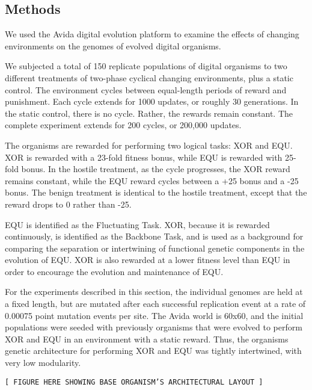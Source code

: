 \subsection{Methods}

We used the Avida digital evolution platform to examine the effects of changing environments on the genomes of evolved digital organisms.

We subjected a total of 150 replicate populations of digital organisms to two different treatments of two-phase cyclical changing environments, plus a static control. The environment cycles between equal-length periods of reward and punishment. Each cycle extends for 1000 updates, or roughly 30 generations. In the static control, there is no cycle. Rather, the rewards remain constant. The complete experiment extends for 200 cycles, or 200,000 updates.

The organisms are rewarded for performing two logical tasks: XOR and EQU. XOR is rewarded with a 23-fold fitness bonus, while EQU is rewarded with 25-fold bonus. In the hostile treatment, as the cycle progresses, the XOR reward remains constant, while the EQU reward cycles between a +25 bonus and a -25 bonus. The benign treatment is identical to the hostile treatment, except that the reward drops to 0 rather than -25.

EQU is identified as the Fluctuating Task. XOR, because it is rewarded continuously, is identified as the Backbone Task, and is used as a background for comparing the separation or intertwining of functional genetic components in the evolution of EQU. XOR is also rewarded at a lower fitness level than EQU in order to encourage the evolution and maintenance of EQU.

For the experiments described in this section, the individual genomes are held at a fixed length, but are mutated after each successful replication event at a rate of 0.00075 point mutation events per site. The Avida world is 60x60, and the initial populations were seeded with previously organisms that were evolved to perform XOR and EQU in an environment with a static reward. Thus, the organisms genetic architecture for performing XOR and EQU was tightly intertwined, with very low modularity.


\verb|[ FIGURE HERE SHOWING BASE ORGANISM’S ARCHITECTURAL LAYOUT ]|
